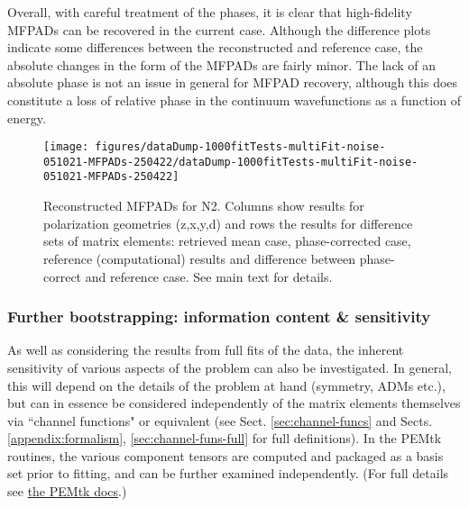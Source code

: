 \documentclass[10pt]{article}
\begin{document}
Overall, with careful treatment of the phases, it is clear that high-fidelity MFPADs can be recovered in the current case. Although the difference plots indicate some differences between the reconstructed and reference case, the absolute changes in the form of the MFPADs are fairly minor. The lack of an absolute phase is not an issue in general for MFPAD recovery, although this does constitute a loss of relative phase in the continuum wavefunctions as a function of energy. %

\begin{figure}[H]
\begin{center}
\texttt{[image: figures/dataDump-1000fitTests-multiFit-noise-051021-MFPADs-250422/dataDump-1000fitTests-multiFit-noise-051021-MFPADs-250422]}
\caption{{Reconstructed MFPADs for N2. Columns show results for polarization
geometries (z,x,y,d) and rows the results for difference sets of matrix
elements: retrieved mean case, phase-corrected case, reference
(computational) results and difference between phase-correct and
reference case. See main text for details.
{\label{454268}}%
}}
\end{center}
\end{figure}

\subsubsection{Further bootstrapping: information content \& sensitivity\label{sec:bootstrapping-info-sensitivity}}

As well as considering the results from full fits of the data, the inherent sensitivity of various aspects of the problem can also be investigated. In general, this will depend on the details of the problem at hand (symmetry, ADMs etc.), but can in essence be considered independently of the matrix elements themselves via ``channel functions" or equivalent (see Sect. \ref{sec:channel-funcs} and Sects. \ref{appendix:formalism}, \ref{sec:channel-funs-full} for full definitions). In the PEMtk routines, the various component tensors are computed and packaged as a basis set prior to fitting, and can be further examined independently. (For full details see \href{https://pemtk.readthedocs.io/en/latest/fitting/PEMtk_fitting_basis-set_demo_050621-full.html}{the PEMtk docs}.)
\end{document}
